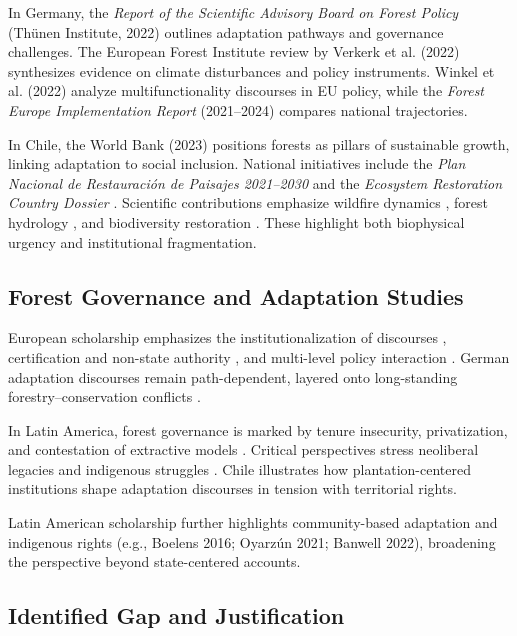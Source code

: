 In Germany, the \textit{Report of the Scientific Advisory Board on Forest Policy} 
(Thünen Institute, 2022) outlines adaptation pathways and governance challenges. 
The European Forest Institute review by Verkerk et al. (2022) synthesizes 
evidence on climate disturbances and policy instruments. Winkel et al. (2022) 
analyze multifunctionality discourses in EU policy, while the \textit{Forest Europe 
Implementation Report} (2021--2024) compares national trajectories.  

In Chile, the World Bank (2023) positions forests as pillars of sustainable growth, 
linking adaptation to social inclusion. National initiatives include the 
\emph{Plan Nacional de Restauración de Paisajes 2021--2030} \parencite{MMA2021} and 
the \emph{Ecosystem Restoration Country Dossier} \parencite{MMACONAF2024}. 
Scientific contributions emphasize wildfire dynamics \parencite{VidalSilva2025}, 
forest hydrology \parencite{Balocchi2023}, and biodiversity restoration 
\parencite{Bosque2022Biodiversity,RCHN2023Restoration}. These highlight both 
biophysical urgency and institutional fragmentation.

\subsection*{Forest Governance and Adaptation Studies}

European scholarship emphasizes the institutionalization of discourses 
\parencite{ArtsBuizer2009,Winkel2011}, certification and non-state authority 
\parencite{Cashore2004}, and multi-level policy interaction 
\parencite{Pulzl2013}. German adaptation discourses remain path-dependent, layered 
onto long-standing forestry–conservation conflicts \parencite{Winkel2011}.  

In Latin America, forest governance is marked by tenure insecurity, privatization, 
and contestation of extractive models \parencite{LarsonRibot2007,Manuschevich2016}. 
Critical perspectives stress neoliberal legacies and indigenous struggles 
\parencite{Gudynas2011,Escobar1996}. Chile illustrates how plantation-centered 
institutions shape adaptation discourses in tension with territorial rights.

Latin American scholarship further highlights community-based adaptation and 
indigenous rights (e.g., Boelens 2016; Oyarzún 2021; Banwell 2022), broadening 
the perspective beyond state-centered accounts.

\subsection*{Identified Gap and Justification}

